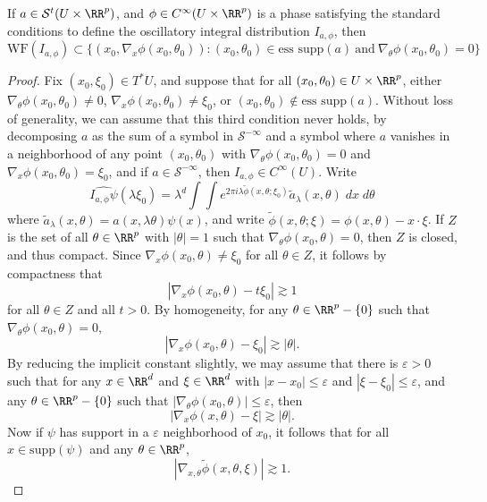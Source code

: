 \begin{theorem}
    If $a \in \mathcal{S}^t(U \times \RR^p)$, and $\phi \in C^\infty(U \times \RR^p)$ is a phase satisfying the standard conditions to define the oscillatory integral distribution $I_{a,\phi}$, then
    \[ \text{WF}(I_{a,\phi}) \subset \{ (x_0,\nabla_x \phi(x_0,\theta_0)): (x_0,\theta_0) \in \text{ess supp}(a)\ \text{and}\ \nabla_\theta \phi(x_0,\theta_0) = 0 \} \]
\end{theorem}
\begin{proof}
    Fix $(x_0,\xi_0) \in T^* U$, and suppose that for all $(x_0,\theta_0) \in U \times \RR^p$, either $\nabla_\theta \phi(x_0,\theta_0) \neq 0$, $\nabla_x \phi(x_0,\theta_0) \neq \xi_0$, or $(x_0,\theta_0) \not \in \text{ess supp}(a)$. Without loss of generality, we can assume that this third condition never holds, by decomposing $a$ as the sum of a symbol in $\mathcal{S}^{-\infty}$ and a symbol where $a$ vanishes in a neighborhood of any point $(x_0,\theta_0)$ with $\nabla_\theta \phi(x_0,\theta_0) = 0$ and $\nabla_x \phi(x_0,\theta_0) = \xi_0$, and if $a \in \mathcal{S}^{-\infty}$, then $I_{a,\phi} \in C^\infty(U)$. Write
    \[ \widehat{I_{a,\phi} \psi}(\lambda \xi_0) = \lambda^d \int \int e^{2 \pi i \lambda \tilde{\phi}(x,\theta;\xi_0)} \tilde{a}_\lambda(x,\theta)\; dx\; d\theta \]
    where $\tilde{a}_\lambda(x,\theta) = a(x, \lambda \theta) \psi(x)$, and write $\tilde{\phi}(x,\theta;\xi) = \phi(x,\theta) - x \cdot \xi$. If $Z$ is the set of all $\theta \in \RR^p$ with $|\theta| = 1$ such that $\nabla_\theta \phi(x_0,\theta) = 0$, then $Z$ is closed, and thus compact. Since $\nabla_x \phi(x_0,\theta) \neq \xi_0$ for all $\theta \in Z$, it follows by compactness that
    \[ |\nabla_x \phi(x_0,\theta) - t \xi_0| \gtrsim 1 \]
    for all $\theta \in Z$ and all $t > 0$. By homogeneity, for any $\theta \in \RR^p - \{ 0 \}$ such that $\nabla_\theta \phi(x_0,\theta) = 0$,
    \[ |\nabla_x \phi(x_0,\theta) - \xi_0| \gtrsim |\theta|. \]
    By reducing the implicit constant slightly, we may assume that there is $\varepsilon > 0$ such that for any $x \in \RR^d$ and $\xi \in \RR^d$ with $|x - x_0| \leq \varepsilon$ and $|\xi - \xi_0| \leq \varepsilon$, and any $\theta \in \RR^p - \{ 0 \}$ such that $|\nabla_\theta \phi(x_0,\theta)| \leq \varepsilon$, then
    \[ |\nabla_x \phi(x,\theta) - \xi| \gtrsim |\theta|. \]
    Now if $\psi$ has support in a $\varepsilon$ neighborhood of $x_0$, it follows that for all $x \in \text{supp}(\psi)$ and any $\theta \in \RR^p$,
    \[ |\nabla_{x,\theta} \tilde{\phi}(x,\theta,\xi)| \gtrsim 1. \]

\end{proof}
